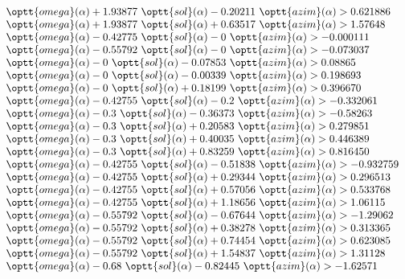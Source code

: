 $$\begin{array}{lll}
   \optt{omega}(\alpha) + 1.93877\ \optt{sol}(\alpha) - 0.20211\ \optt{azim}(\alpha) > 0.621886\\
   \optt{omega}(\alpha) + 1.93877\ \optt{sol}(\alpha) + 0.63517\ \optt{azim}(\alpha) > 1.57648\\
   \optt{omega}(\alpha) - 0.42775\ \optt{sol}(\alpha) - 0\ \optt{azim}(\alpha) > -0.000111\\
   \optt{omega}(\alpha) - 0.55792\ \optt{sol}(\alpha) - 0\ \optt{azim}(\alpha) > -0.073037\\
   \optt{omega}(\alpha) - 0\ \optt{sol}(\alpha) - 0.07853\ \optt{azim}(\alpha) > 0.08865\\
   \optt{omega}(\alpha) - 0\ \optt{sol}(\alpha) - 0.00339\ \optt{azim}(\alpha) > 0.198693\\
   \optt{omega}(\alpha) - 0\ \optt{sol}(\alpha) + 0.18199\ \optt{azim}(\alpha) > 0.396670\\
   \optt{omega}(\alpha) - 0.42755\ \optt{sol}(\alpha) - 0.2\ \optt{azim}(\alpha) > -0.332061\\
   \optt{omega}(\alpha) - 0.3\ \optt{sol}(\alpha) - 0.36373\ \optt{azim}(\alpha) > -0.58263\\
   \optt{omega}(\alpha) - 0.3\ \optt{sol}(\alpha) + 0.20583\ \optt{azim}(\alpha) > 0.279851\\
   \optt{omega}(\alpha) - 0.3\ \optt{sol}(\alpha) + 0.40035\ \optt{azim}(\alpha) > 0.446389\\
   \optt{omega}(\alpha) - 0.3\ \optt{sol}(\alpha) + 0.83259\ \optt{azim}(\alpha) > 0.816450\\
   \optt{omega}(\alpha) - 0.42755\ \optt{sol}(\alpha) - 0.51838\ \optt{azim}(\alpha) > -0.932759\\
   \optt{omega}(\alpha) - 0.42755\ \optt{sol}(\alpha) + 0.29344\ \optt{azim}(\alpha) > 0.296513\\
   \optt{omega}(\alpha) - 0.42755\ \optt{sol}(\alpha) + 0.57056\ \optt{azim}(\alpha) > 0.533768\\
   \optt{omega}(\alpha) - 0.42755\ \optt{sol}(\alpha) + 1.18656\ \optt{azim}(\alpha) > 1.06115\\
   \optt{omega}(\alpha) - 0.55792\ \optt{sol}(\alpha) - 0.67644\ \optt{azim}(\alpha) > -1.29062\\
   \optt{omega}(\alpha) - 0.55792\ \optt{sol}(\alpha) + 0.38278\ \optt{azim}(\alpha) > 0.313365\\
   \optt{omega}(\alpha) - 0.55792\ \optt{sol}(\alpha) + 0.74454\ \optt{azim}(\alpha) > 0.623085\\
   \optt{omega}(\alpha) - 0.55792\ \optt{sol}(\alpha) + 1.54837\ \optt{azim}(\alpha) > 1.31128\\
   \optt{omega}(\alpha) - 0.68\ \optt{sol}(\alpha) - 0.82445\ \optt{azim}(\alpha) > -1.62571\\
\end{array}
$$

